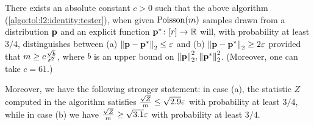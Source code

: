 \begin{proposition}\label{prop:l2:identity:tester}
There exists an absolute constant $c > 0$ such that the above algorithm (\cref{algo:tol:l2:identity:tester}), when given $\operatorname{Poisson}\!\left( m \right) $ samples drawn from a distribution $\mathbf{p}$ and an explicit function $\mathbf{p}^\ast\colon[r]\to\mathbb{R}$ will, with probability at least $3/4$, 
distinguishes between \textsf{(a)} ${\lVert \mathbf{p}-\mathbf{p}^\ast {\rVert}}_2 \leq \varepsilon$ and \textsf{(b)} ${\lVert \mathbf{p}-\mathbf{p}^\ast {\rVert}}_2 \geq 2\varepsilon$ provided that $m \geq c\frac{\sqrt{b}}{\varepsilon^2}$, where $b$ is an upper bound on ${\lVert \mathbf{p} {\rVert}}_2^2, {\lVert \mathbf{p}^\ast {\rVert}}_2^2$. (Moreover, one can take $c = 61$.)

Moreover, we have the following stronger statement: in case (a), the statistic $Z$ computed in the algorithm satisfies $\frac{\sqrt{Z}}{m} \leq \sqrt{2.9}\varepsilon$ with probability at least $3/4$, while in case (b) we have $\frac{\sqrt{Z}}{m} \geq \sqrt{3.1}\varepsilon$ with probability at least $3/4$.
\end{proposition}
